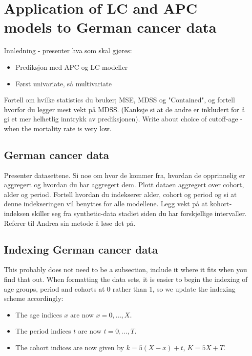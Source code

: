 \newpage
\section{Application of LC and APC models to German cancer data}
\textcolor{myDarkGreen}{Innledning - presenter hva som skal gjøres:
\begin{itemize}
    \item Prediksjon med APC og LC modeller
    \item Først univariate, så multivariate
\end{itemize}
\newline \newline
Fortell om hvilke statistics du bruker; MSE, MDSS og "Contained", og fortell hvorfor du legger mest vekt på MDSS. (Kanksje si at de andre er inkludert for å gi et mer helhetlig inntrykk av prediksjonen). 
Write about choice of cutoff-age - when the mortality rate is very low. 
}

\subsection{German cancer data}
\label{sec:GermanCancerData}
\textcolor{myDarkGreen}{
Presenter datasettene. Si noe om hvor de kommer fra, hvordan de opprinnelig er aggregert og hvordan du har aggregert dem. Plott dataen aggregert over cohort, alder og period. Fortell hvordan du indekserer alder, cohort og period og si at denne indekseringen vil benyttes for alle modellene. Legg vekt på at kohort-indeksen skiller seg fra synthetic-data stadiet siden du har forskjellige intervaller. Referer til Andrea sin metode å løse det på. 
}

\subsection{Indexing German cancer data}
\textcolor{myDarkGreen}{This probably does not need to be a subsection, include it where it fits when you find that out. }
When formatting the data sets, it is easier to begin the indexing of age groups, period and cohorts at 0 rather than 1, so we update the indexing scheme accordingly:
\begin{itemize}
    \item The age indices $x$ are now $x = 0,\ldots,X$.
    \item The period indices $t$ are now $t = 0, \ldots, T$.
    \item The cohort indices are now given by $k = 5(X - x) + t$, $K = 5X + T$.
\end{itemize}


